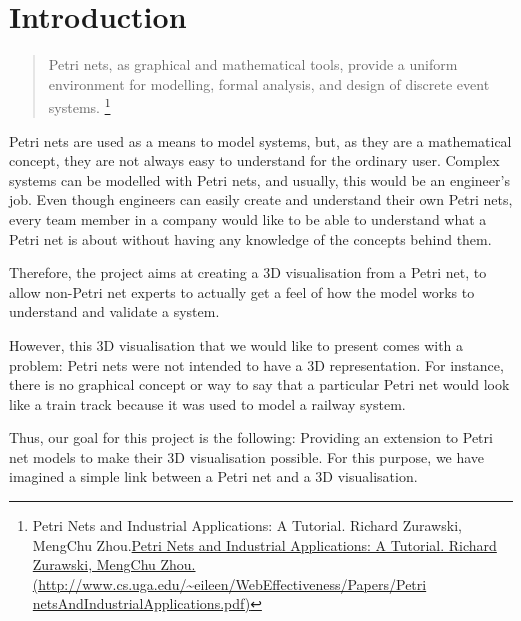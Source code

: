 \section{Introduction}



\begin{quotation}
Petri nets, as graphical and mathematical tools, provide a uniform environment for modelling, formal analysis, and design of discrete event systems. \footnote{Petri Nets and Industrial Applications: A Tutorial. Richard Zurawski, MengChu Zhou.\url{Petri Nets and Industrial Applications: A Tutorial. Richard Zurawski, MengChu Zhou. (http://www.cs.uga.edu/~eileen/WebEffectiveness/Papers/Petri netsAndIndustrialApplications.pdf)}}
\end{quotation}

Petri nets are used as a means to model systems, but, as they are a mathematical concept, they are not always easy to understand for the ordinary user. Complex systems can be modelled with Petri nets, and usually, this would be an engineer's job. Even though engineers can easily create and understand their own Petri nets, every team member in a company would like to be able to understand what a Petri net is about without having any knowledge of the concepts behind them.

Therefore, the project aims at creating a 3D visualisation from a Petri net, to allow non-Petri net experts to actually get a feel of how the model works to understand and validate a system.

However, this 3D visualisation that we would like to present comes with a problem: Petri nets were not intended to have a 3D representation. For instance, there is no graphical concept or way to say that a particular Petri net would look like a train track because it was used to model a railway system. 

Thus, our goal for this project is the following: Providing an extension to Petri net models to make their 3D visualisation possible. For this purpose, we have imagined a simple link between a Petri net and a 3D visualisation.

